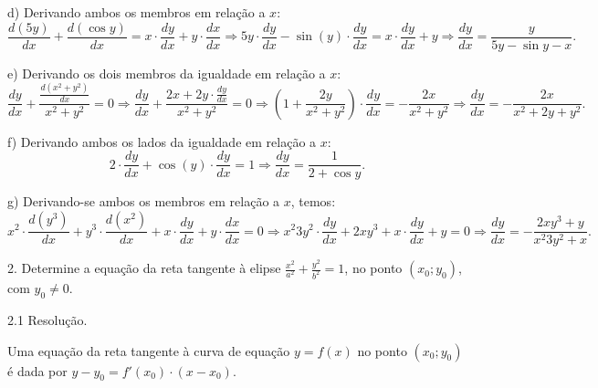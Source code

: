 \documentclass{article}
\begin{document}
{\begin{newpage}
\par
\vspace{0.3cm}
d) Derivando ambos os membros em relação a $x$:
\begin{equation*} \displaystyle{\frac{d(5y)}{dx} + \frac{d(\cos{y})}{dx} = x\cdot\frac{dy}{dx} + y\cdot\frac{dx}{dx} \Rightarrow 5y\cdot\frac{dy}{dx} - \sin{(y)}\cdot\frac{dy}{dx} = x\cdot\frac{dy}{dx} + y \Rightarrow \frac{dy}{dx} = \frac{y}{5y - \sin{y} - x}}. \end{equation*}
\par
\vspace{0.3cm}
e) Derivando os dois membros da igualdade em relação a $x$:
\begin{equation*} \displaystyle{\frac{dy}{dx} + \frac{\frac{d(x^2 + y^2)}{dx}}{x^2 + y^2} = 0 \Rightarrow \frac{dy}{dx} + \frac{2x + 2y\cdot\frac{dy}{dx}}{x^2 + y^2} = 0 \Rightarrow (1 + \frac{2y}{x^2 + y^2})\cdot\frac{dy}{dx} = -\frac{2x}{x^2 + y^2} \Rightarrow \frac{dy}{dx} = -\frac{2x}{x^2 + 2y + y^2}} .\end{equation*}
\par
\vspace{0.3cm}
f) Derivando ambos os lados da igualdade em relação a $x$:
\begin{equation*} \displaystyle{2\cdot\frac{dy}{dx} + \cos{(y)}\cdot\frac{dy}{dx} = 1 \Rightarrow \frac{dy}{dx} = \frac{1}{2 + \cos{y}}} .\end{equation*}
\par
\vspace{0.3cm}
g) Derivando-se ambos os membros em relação a $x$, temos:
\begin{equation*} \displaystyle{x^{2}\cdot\frac{d(y^3)}{dx} + y^{3}\cdot\frac{d(x^2)}{dx} + x\cdot\frac{dy}{dx} + y\cdot\frac{dx}{dx} = 0 \Rightarrow x^{2}3y^{2}\cdot\frac{dy}{dx} + 2xy^{3} + x\cdot\frac{dy}{dx} + y = 0 \Rightarrow \frac{dy}{dx} = -\frac{2xy^{3} + y}{x^{2}3y^{2} + x}} .\end{equation*}
\par
\vspace{0.3cm}
\begin{flushleft}
2. Determine a equação da reta tangente à elipse $\displaystyle{\frac{x^2}{a^2} + \frac{y^2}{b^2} = 1}$, no ponto $(x_0 ; y_0)$, com $y_0\neq 0$.
\end{flushleft}
\par
\vspace{0.3cm}
\begin{flushleft}
2.1 Resolução.
\end{flushleft}
\par Uma equação da reta tangente à curva de equação $y=f(x)$ no ponto $(x_0 ; y_0)$ é dada por $y - y_0 = f'(x_0)\cdot (x - x_0)$.

\end{newpage}}
\end{document}
